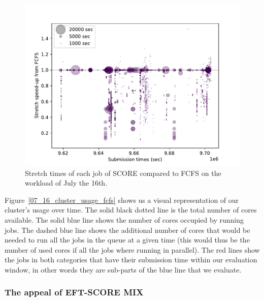 \documentclass[conference,10pt]{IEEEtran}
\begin{document}
\begin{figure}[H]\centering\includegraphics[scale=0.47]{../MBSS/plot/Stretch_times/Stretch_times_FCFS_SCORE_2022-07-16->2022-07-16_V10000_450_128_32_256_4_1024.pdf}\caption{Stretch times of each job of SCORE compared to FCFS on the workload of July the 16th.}\end{figure}

Figure~\ref{07_16_cluster_usage_fcfs} shows us a visual representation of 
our cluster's usage over time. The solid black dotted line is the total
number of cores available.
The solid blue line shows the number of cores occupied by running jobs.
The dashed blue line shows the additional number of cores that would be needed
to run all the jobs in the queue at a given time (this would thus be the number
of used cores if all the jobs where running in parallel).
The red lines show the jobs in both categories that have their submission
time within our evaluation window, in other words they are sub-parts of the blue line
that we evaluate.


\subsubsection{The appeal of EFT-SCORE MIX}
\end{document}
